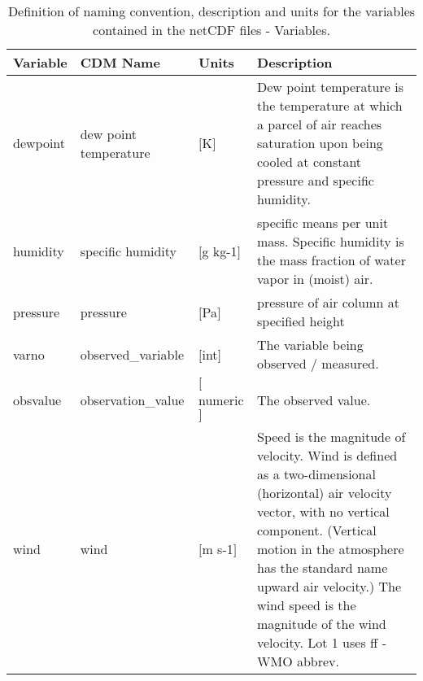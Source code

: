 \begin{table}[!htbp] 
\footnotesize
\begin{center}
\renewcommand{\arraystretch}{1.3}
\begin{tabular}{  l p{1.5in} l p{3.0in} } \\

\textbf{Variable} & \textbf{CDM Name} & \textbf{Units} & \textbf{Description}  \\ \toprule
dewpoint & dew point temperature & $[$K$]$ & Dew point temperature is the temperature at which a parcel of air reaches saturation upon being cooled at constant pressure and specific humidity.\\ 
humidity & specific humidity & $[$g kg-1$]$ & specific means per unit mass. Specific humidity is the mass fraction of water vapor in (moist) air.\\ 
pressure & pressure & $[$Pa$]$ & pressure of air column at specified height\\ 
varno & observed\_variable & $[$int$]$ & The variable being observed / measured.\\ 
obsvalue & observation\_value & $[$numeric$]$ & The observed value.\\ 
wind & wind & $[$m s-1$]$ & Speed is the magnitude of velocity. Wind is defined as a two-dimensional (horizontal) air velocity vector,  with no vertical component. (Vertical motion in the atmosphere has the standard name upward air velocity.) The wind speed is the magnitude of the wind velocity. Lot 1 uses ff  - WMO abbrev.\\ 
\bottomrule \bottomrule
\end{tabular}
\end{center}
\caption{Definition of naming convention, description and units for the variables contained in the netCDF files - Variables.}
\label{CDM}
\end{table}
